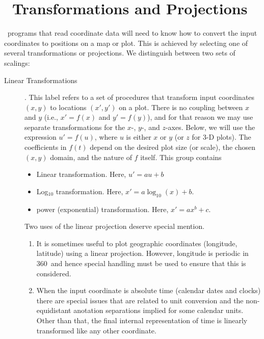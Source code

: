 %
%
\chapter{\gmt\ Transformations and Projections}
\thispagestyle{headings}

\GMT\ programs that read coordinate data will need to know how
to convert the input coordinates to positions on a map or plot.
This is achieved by selecting one of several transformations or projections.
We distinguish between two sets of scalings:

\begin{description}
\item [Linear Transformations].  This label refers to a set of procedures
that transform input coordinates $(x,y)$ to locations $(x', y')$ on a plot.
There is no coupling between $x$ and $y$ (i.e., $x' = f(x)$ and $y' = f(y)$),
and for that reason we may use separate transformations for the $x$-, $y$-, and
$z$-axes.
Below, we will use the expression $u' = f(u)$, where $u$ is either $x$ or $y$ (or $z$ for
3-D plots).
The coefficients in $f(t)$ depend on the desired plot
size (or scale), the chosen $(x,y)$ domain, and the nature of $f$ itself.
This group contains

\begin{itemize}
\item Linear transformation.  Here, $u' = au + b$
\item Log$_{10}$ transformation.  Here, $x' = a \log_{10}(x) + b$.
\item power (exponential) transformation.  Here, $x' = a x^b + c$.
\end{itemize}

Two uses of the linear projection deserve special mention.

\begin{enumerate}
\item It is sometimes useful to plot geographic coordinates (longitude, latitude) using
a linear projection.  However, longitude is periodic in 360\DS\ and hence special handling
must be used to ensure that this is considered.
\item When the input coordinate is absolute time (calendar dates and clocks) there are special
issues that are related to unit conversion and the non-equidistant anotation separations implied for
some calendar units.  Other than that, the final internal representation of time is linearly transformed
like any other coordinate.
\end{enumerate}


\end{description}
